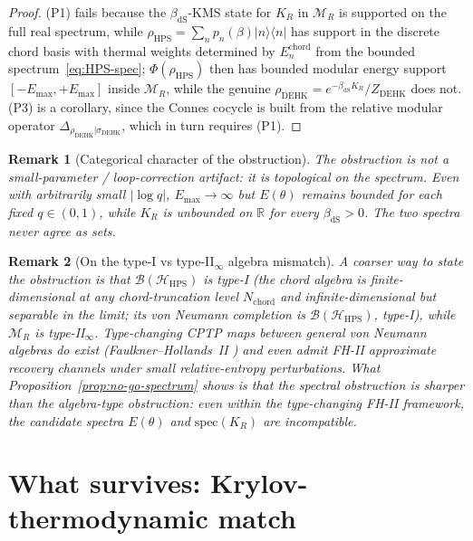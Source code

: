 \documentclass[12pt,a4paper]{article}
\newtheorem{remark}{Remark}
\theoremstyle{definition}
\begin{document}
\begin{proof}
(P1) fails because the $\beta_{\mathrm{dS}}$-KMS state for $K_R$ in
$\mathcal{M}_R$ is supported on the full real spectrum, while
$\rho_{\mathrm{HPS}} = \sum_n p_n(\beta)|n\rangle\langle n|$ has support
in the discrete chord basis with thermal weights determined by
$E_n^{\mathrm{chord}}$ from the bounded spectrum~\eqref{eq:HPS-spec};
$\Phi(\rho_{\mathrm{HPS}})$ then has bounded modular energy support
$[-E_{\max},+E_{\max}]$ inside $\mathcal{M}_R$, while the genuine
$\rho_{\mathrm{DEHK}}=e^{-\beta_{\mathrm{dS}}K_R}/Z_{\mathrm{DEHK}}$ does
not. (P3) is a corollary, since the Connes cocycle is built from the
relative modular operator $\Delta_{\rho_{\mathrm{DEHK}}|\sigma_{\mathrm{DEHK}}}$,
which in turn requires (P1).
\end{proof}

\begin{remark}[Categorical character of the obstruction]
The obstruction is not a small-parameter / loop-correction artifact: it is
\emph{topological} on the spectrum. Even with arbitrarily small $|\log q|$,
$E_{\max}\to\infty$ but $E(\theta)$ remains bounded for each fixed $q\in
(0,1)$, while $K_R$ is unbounded on $\mathbb{R}$ for every $\beta_{\mathrm{dS}}>0$.
The two spectra never agree as sets.
\end{remark}

\begin{remark}[On the type-I vs type-II$_\infty$ algebra mismatch]
A coarser way to state the obstruction is that
$\mathcal{B}(\mathcal{H}_{\mathrm{HPS}})$ is type-I
(the chord algebra is finite-dimensional at any chord-truncation level
$N_{\mathrm{chord}}$ and infinite-dimensional but separable in the limit;
its von Neumann completion is $\mathcal{B}(\mathcal{H}_{\mathrm{HPS}})$,
type-I), while $\mathcal{M}_R$ is type-II$_\infty$. Type-changing CPTP
maps between general von Neumann algebras do exist (Faulkner--Hollands~II
\cite{FaulknerHollandsII2020}) and even admit FH-II approximate recovery
channels under small relative-entropy perturbations. What
Proposition~\ref{prop:no-go-spectrum} shows is that the
\emph{spectral obstruction} is sharper than the algebra-type obstruction:
even within the type-changing FH-II framework, the candidate spectra
$E(\theta)$ and $\mathrm{spec}(K_R)$ are incompatible.
\end{remark}

\section{What survives: Krylov-thermodynamic match}
\label{sec:survives}
\end{document}
